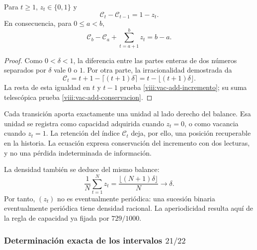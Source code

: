\begin{proposition}
\label{viii:vac-add-balance}
Para \(t\geq1\), \(z_t\in\{0,1\}\) y
\begin{equation}
 \mathcal C_t-\mathcal C_{t-1}=1-z_t.
 \label{viii:vac-add-incremento}
\end{equation}
En consecuencia, para \(0\leq a<b\),
\begin{equation}
 \mathcal C_b-\mathcal C_a+
 \sum_{t=a+1}^{b}z_t=b-a.
 \label{viii:vac-add-conservacion}
\end{equation}
\end{proposition}
\begin{proof}
Como \(0<\delta<1\), la diferencia entre las partes enteras de dos
números separados por \(\delta\) vale \(0\) o \(1\). Por otra parte,
la irracionalidad demostrada da
\[
 \mathcal C_t=t+1-\lceil(t+1)\delta\rceil
             =t-\lfloor(t+1)\delta\rfloor.
\]
La resta de esta igualdad en \(t\) y \(t-1\) prueba
\eqref{viii:vac-add-incremento}; su suma telescópica prueba
\eqref{viii:vac-add-conservacion}.
\end{proof}

Cada transición aporta exactamente una unidad al lado derecho del
balance. Esa unidad se registra como capacidad adquirida cuando
\(z_t=0\), o como vacancia cuando \(z_t=1\). La retención del índice
\(\mathcal C_t\) deja, por ello, una posición recuperable en la
historia. La ecuación expresa conservación del incremento con dos
lecturas, y no una pérdida indeterminada de información.

La densidad también se deduce del mismo balance:
\[
 \frac1N\sum_{t=1}^{N}z_t
 =\frac{\lfloor(N+1)\delta\rfloor}{N}\longrightarrow\delta.
\]
Por tanto, \((z_t)\) no es eventualmente periódica: una sucesión binaria
eventualmente periódica tiene densidad racional. La aperiodicidad
resulta aquí de la regla de capacidad ya fijada por \(729/1000\).

\subsubsection{Determinación exacta de los intervalos \(21/22\)}
\label{viii:vac-add-primarios}

